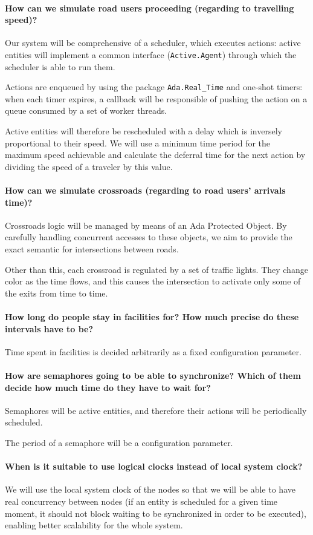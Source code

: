 \paragraph{How can we simulate road users proceeding (regarding to travelling
  speed)?}
Our system will be comprehensive of a scheduler, which executes actions:
active entities will implement a common interface (\texttt{Active.Agent})
through which the scheduler is able to run them.

Actions are enqueued by using the package \texttt{Ada.Real\_Time} and one-shot
timers: when each timer expires, a callback will be responsible of pushing the
action on a queue consumed by a set of worker threads.

Active entities will therefore be rescheduled with a delay which is inversely
proportional to their speed. We will use a minimum time period for the maximum
speed achievable and calculate the deferral time for the next action by
dividing the speed of a traveler by this value.

\paragraph{How can we simulate crossroads (regarding to road users' arrivals
  time)?}
Crossroads logic will be managed by means of an Ada Protected Object. By
carefully handling concurrent accesses to these objects, we aim to provide the
exact semantic for intersections between roads.

Other than this, each crossroad is regulated by a set of traffic lights. They
change color as the time flows, and this causes the intersection to activate
only some of the exits from time to time.

\paragraph{How long do people stay in facilities for? How much precise do these
  intervals have to be?}
Time spent in facilities is decided arbitrarily as a fixed configuration
parameter.

\paragraph{How are semaphores going to be able to synchronize? Which of them
  decide how much time do they have to wait for?}
Semaphores will be active entities, and therefore their actions will be
periodically scheduled.

The period of a semaphore will be a configuration parameter.

\paragraph{When is it suitable to use logical clocks instead of local system
  clock?}
We will use the local system clock of the nodes so that we will be able to
have real concurrency between nodes (if an entity is scheduled for a given
time moment, it should not block waiting to be synchronized in order to be
executed), enabling better scalability for the whole system.
